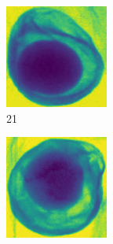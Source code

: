 \documentclass[11pt]{article}
\begin{document}
    \newpage
    \begin{figure}[!h]
    \captionsetup[subfigure]{labelformat=empty}
    \ContinuedFloat
    \captionsetup{list=no}
    \begin{subfigure}[b]{0.22\textwidth}
         \centering
         \includegraphics[width=\textwidth]{figurer/avocado_dataset/avo_20.jpg}
         \caption{21}
         \label{fig:avo_20}
     \end{subfigure}
     \hfill
     \begin{subfigure}[b]{0.22\textwidth}
         \centering
         \includegraphics[width=\textwidth]{figurer/avocado_dataset/avo_21.jpg}

\end{subfigure}
\end{figure}
\end{document}
